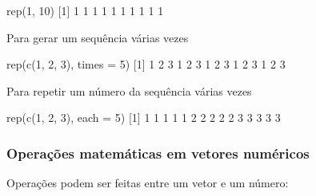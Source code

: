 \documentclass[
  10pt,
  a4paper]{book}
\newenvironment{Shaded}{\begin{snugshade}}{\end{snugshade}}
\newcommand{\AttributeTok}[1]{\textcolor[rgb]{0.77,0.63,0.00}{#1}}
\newcommand{\DecValTok}[1]{\textcolor[rgb]{0.00,0.00,0.81}{#1}}
\newcommand{\FunctionTok}[1]{\textcolor[rgb]{0.00,0.00,0.00}{#1}}
\newcommand{\NormalTok}[1]{#1}
\begin{document}
\begin{Shaded}
\begin{Highlighting}[]
\FunctionTok{rep}\NormalTok{(}\DecValTok{1}\NormalTok{, }\DecValTok{10}\NormalTok{)}
\NormalTok{ [}\DecValTok{1}\NormalTok{] }\DecValTok{1} \DecValTok{1} \DecValTok{1} \DecValTok{1} \DecValTok{1} \DecValTok{1} \DecValTok{1} \DecValTok{1} \DecValTok{1} \DecValTok{1}
\end{Highlighting}
\end{Shaded}

Para gerar um sequência várias vezes

\begin{Shaded}
\begin{Highlighting}[]
\FunctionTok{rep}\NormalTok{(}\FunctionTok{c}\NormalTok{(}\DecValTok{1}\NormalTok{, }\DecValTok{2}\NormalTok{, }\DecValTok{3}\NormalTok{), }\AttributeTok{times =} \DecValTok{5}\NormalTok{)}
\NormalTok{ [}\DecValTok{1}\NormalTok{] }\DecValTok{1} \DecValTok{2} \DecValTok{3} \DecValTok{1} \DecValTok{2} \DecValTok{3} \DecValTok{1} \DecValTok{2} \DecValTok{3} \DecValTok{1} \DecValTok{2} \DecValTok{3} \DecValTok{1} \DecValTok{2} \DecValTok{3}
\end{Highlighting}
\end{Shaded}

Para repetir um número da sequência várias vezes

\begin{Shaded}
\begin{Highlighting}[]
\FunctionTok{rep}\NormalTok{(}\FunctionTok{c}\NormalTok{(}\DecValTok{1}\NormalTok{, }\DecValTok{2}\NormalTok{, }\DecValTok{3}\NormalTok{), }\AttributeTok{each =} \DecValTok{5}\NormalTok{)}
\NormalTok{ [}\DecValTok{1}\NormalTok{] }\DecValTok{1} \DecValTok{1} \DecValTok{1} \DecValTok{1} \DecValTok{1} \DecValTok{2} \DecValTok{2} \DecValTok{2} \DecValTok{2} \DecValTok{2} \DecValTok{3} \DecValTok{3} \DecValTok{3} \DecValTok{3} \DecValTok{3}
\end{Highlighting}
\end{Shaded}

\hypertarget{operauxe7uxf5es-matemuxe1ticas-em-vetores-numuxe9ricos}{%
\subsubsection{Operações matemáticas em vetores numéricos}\label{operauxe7uxf5es-matemuxe1ticas-em-vetores-numuxe9ricos}}

Operações podem ser feitas entre um vetor e um número:
\end{document}
